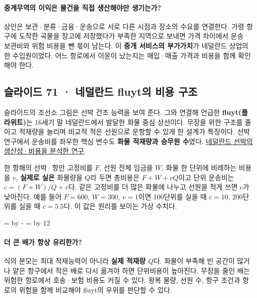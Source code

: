 \documentclass[10pt,a4paper]{article}
\newcommand{\ReserveQuestionSpace}{%
  \par\begingroup
  \dimen0=\pagegoal \advance\dimen0 by -\pagetotal
  \dimen2=\baselineskip \multiply\dimen2 by 12
  \ifdim\dimen0<\dimen2 \newpage\fi
  \endgroup}
\begin{document}
\paragraph{중계무역의 이익은 물건을 직접 생산해야만 생기는가?}
상인은 보관·분류·금융·운송으로 서로 다른 시점과 장소의 수요를 연결한다. 가령 항구에 도착한 곡물을 창고에 저장했다가 부족한 지역으로 보내면 가격 차이에서 운송·보관비와 위험 비용을 뺀 몫이 남는다. 이 \textbf{중개 서비스의 부가가치}가 네덜란드 상업의 한 수입원이었다. 어느 항로에서 이윤이 났는지는 매입·매출 가격과 비용을 함께 확인해야 한다.\par

\subsection{슬라이드 71 · 네덜란드 fluyt의 비용 구조}
슬라이드의 조선소 그림은 선박 건조 능력을 보여 준다. 그와 연결해 언급한 \textbf{fluyt(플라위트)}는 16세기 말 네덜란드에서 발달한 화물 중심 상선이다. 무장을 위한 구조를 줄이고 적재량을 늘리며 비교적 적은 선원으로 운항할 수 있게 한 설계가 특징이다. 선박 연구에서 운송비를 좌우한 핵심 변수도 \textbf{화물 적재량과 승무원 수}였다. \href{https://www.cambridge.org/core/books/abs/rise-of-merchant-empires/productivity-profitability-and-costs-of-private-and-corporate-dutch-ship-owning-in-the-seventeenth-and-eighteenth-centuries/1FFEF5EF43A094A91A8FD560B7ADBB71}{네덜란드 선박의 생산성·비용을 분석한 연구}.\par

한 항해의 선박·항만 고정비를 $F$, 선원 전체 임금을 $W$, 화물 한 단위에 비례하는 비용을 $v$, \textbf{실제로 실은} 화물량을 $Q$라 두면 총비용은 $F+W+vQ$이고 단위 운송비는 $c=(F+W)/Q+v$다. 같은 고정비를 더 많은 화물에 나누고 선원을 적게 쓰면 $c$가 낮아진다. 예를 들어 $F=600$, $W=300$, $v=1$이면 100단위를 실을 때 $c=10$, 200단위를 실을 때 $c=5.5$다. 이 값은 원리를 보이는 가상 수치다.\par

\ReserveQuestionSpace
\paragraph{더 큰 배가 항상 유리한가?}
식의 분모는 최대 적재능력이 아니라 \textbf{실제 적재량 $Q$}다. 화물이 부족해 빈 공간이 많거나 얕은 항구에서 작은 배로 다시 옮겨야 하면 단위비용이 높아진다. 무장을 줄인 배는 위험한 항로에서 호송·보험 비용도 커질 수 있다. 왕복 물량, 선원 수, 항구 조건과 항로의 위험을 함께 비교해야 fluyt의 우위를 판단할 수 있다.\par
\end{document}
